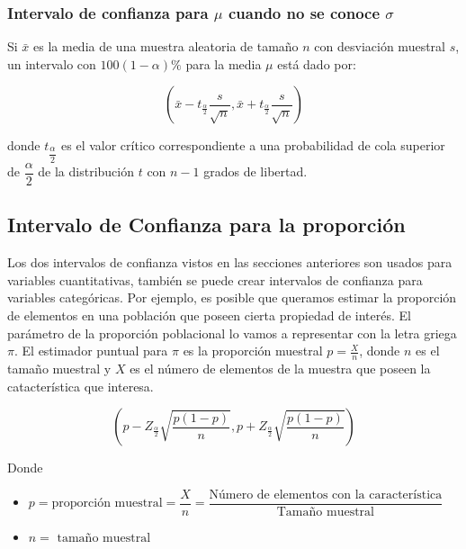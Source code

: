 \documentclass[]{book}
\begin{document}
\hypertarget{icsd}{%
\subsubsection{\texorpdfstring{Intervalo de confianza para \(\mu\) cuando no se conoce \(\sigma\)}{Intervalo de confianza para \textbackslash{}mu cuando no se conoce \textbackslash{}sigma}}\label{icsd}}

Si \(\bar{x}\) es la media de una muestra aleatoria de tamaño \(n\) con desviación muestral \(s\), un intervalo con \(100\left(1-\alpha\right)\%\) para la media \(\mu\) está dado por:

\begin{equation} 
  \left(\bar{x} - t_{\frac{\alpha}{2}}\dfrac{s}{\sqrt{n}}, \bar{x} + t_{\frac{\alpha}{2}}\dfrac{s}{\sqrt{n}}  \right)
  \label{eq:icmusd}
\end{equation}

donde \(t_{\dfrac{\alpha}{2}}\) es el valor crítico correspondiente a una probabilidad de cola superior de \(\dfrac{\alpha}{2}\) de la distribución \(t\) con \(n-1\) grados de libertad.

\hypertarget{intervalo-de-confianza-para-la-proporcion}{%
\subsection{Intervalo de Confianza para la proporción}\label{intervalo-de-confianza-para-la-proporcion}}

Los dos intervalos de confianza vistos en las secciones anteriores son usados para variables cuantitativas, también se puede crear intervalos de confianza para variables categóricas. Por ejemplo, es posible que queramos estimar la proporción de elementos en una población que poseen cierta propiedad de interés. El parámetro de la proporción poblacional lo vamos a representar con la letra griega \(\pi\). El estimador puntual para \(\pi\) es la proporción muestral \(p=\frac{X}{n}\), donde \(n\) es el tamaño muestral y \(X\) es el número de elementos de la muestra que poseen la catacterística que interesa.

\begin{equation} 
  \left(p - Z_{\frac{\alpha}{2}}\sqrt{\dfrac{p\left(1-p\right)}{n}}, p + Z_{\frac{\alpha}{2}}\sqrt{\dfrac{p\left(1-p\right)}{n}}  \right)
  \label{eq:icprop}
\end{equation}

Donde

\begin{itemize}
\item
  \(p=\text{proporción muestral}=\dfrac{X}{n} =\dfrac{\text{Número de elementos con la característica}}{\text{Tamaño muestral}}\)
\item
  \(n= \text{ tamaño muestral}\)
\end{itemize}
\end{document}
